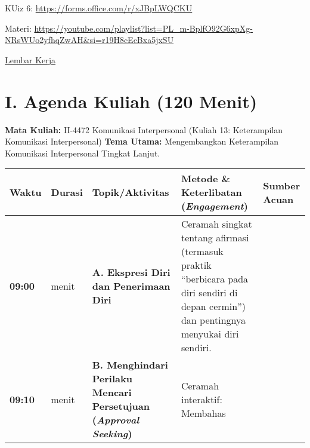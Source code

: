 \documentclass[
  letterpaper,
  DIV=11,
  numbers=noendperiod]{scrreprt}
\begin{document}
KUiz 6: \url{https://forms.office.com/r/xJBpLWQCKU}

Materi:
\url{https://youtube.com/playlist?list=PL_m-BplfO92G6xpXg-NRsWUo2yfhqZwAH&si=r19H8cEcBxa5jxSU}

\href{../bahan/Akitivitas_6.xlsx}{Lembar Kerja}

\section{I. Agenda Kuliah (120 Menit)}\label{i.-agenda-kuliah-120-menit}

\textbf{Mata Kuliah:} II-4472 Komunikasi Interpersonal (Kuliah 13:
Keterampilan Komunikasi Interpersonal) \textbf{Tema Utama:}
Mengembangkan Keterampilan Komunikasi Interpersonal Tingkat Lanjut.

\begin{longtable}[]{@{}
  >{\raggedright\arraybackslash}p{}
  >{\raggedright\arraybackslash}p{}
  >{\raggedright\arraybackslash}p{}
  >{\raggedright\arraybackslash}p{}
  >{\raggedright\arraybackslash}p{}@{}}
\toprule\noalign{}
\begin{minipage}[b]{\linewidth}\raggedright
Waktu
\end{minipage} & \begin{minipage}[b]{\linewidth}\raggedright
Durasi
\end{minipage} & \begin{minipage}[b]{\linewidth}\raggedright
Topik/Aktivitas
\end{minipage} & \begin{minipage}[b]{\linewidth}\raggedright
Metode \& Keterlibatan (\emph{Engagement})
\end{minipage} & \begin{minipage}[b]{\linewidth}\raggedright
Sumber Acuan
\end{minipage} \\
\midrule\noalign{}
\endhead
\bottomrule\noalign{}
\endlastfoot
\textbf{09:00} & 10 menit & \textbf{A. Ekspresi Diri dan Penerimaan
Diri} & Ceramah singkat tentang afirmasi (termasuk praktik ``berbicara
pada diri sendiri di depan cermin'') dan pentingnya menyukai diri
sendiri. & \\
\textbf{09:10} & 15 menit & \textbf{B. Menghindari Perilaku Mencari
Persetujuan (\emph{Approval Seeking})} & Ceramah interaktif: Membahas

\end{longtable}
\end{document}
